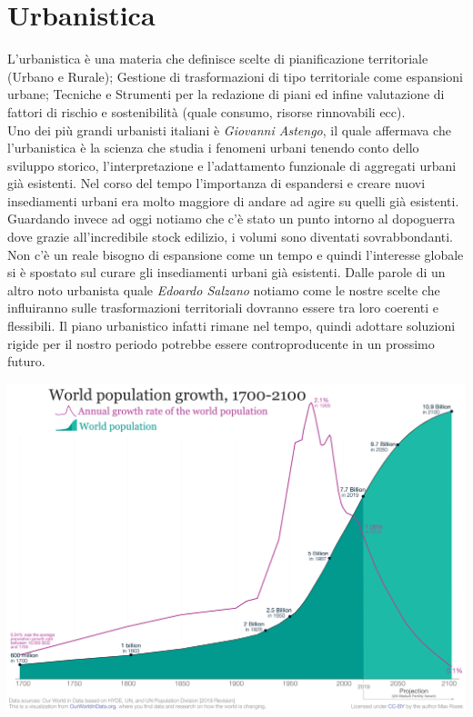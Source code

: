 \documentclass[a4paper,12pt, oneside]{book}
\begin{document}
\section{Urbanistica}
L'urbanistica è una materia che definisce scelte di pianificazione territoriale (Urbano e Rurale); Gestione di trasformazioni di tipo territoriale come espansioni urbane; Tecniche e Strumenti per la redazione di piani ed infine valutazione di fattori di rischio e sostenibilità (quale consumo, risorse rinnovabili ecc).\\
Uno dei più grandi urbanisti italiani è \textit{Giovanni Astengo}, il quale affermava che l'urbanistica è la scienza che studia i fenomeni urbani tenendo conto dello sviluppo storico, l'interpretazione e l'adattamento funzionale di aggregati urbani già esistenti.\newline
Nel corso del tempo l'importanza di espandersi e creare nuovi insediamenti urbani era molto maggiore di andare ad agire su quelli già esistenti. Guardando invece ad oggi notiamo che c'è stato un punto intorno al dopoguerra dove grazie all'incredibile stock edilizio, i volumi sono diventati sovrabbondanti. Non c'è un reale bisogno di espansione come un tempo e quindi l'interesse globale si è spostato sul curare gli insediamenti urbani già esistenti.\newline
Dalle parole di un altro noto urbanista quale \textit{Edoardo Salzano} notiamo come le nostre scelte che influiranno sulle trasformazioni territoriali dovranno essere tra loro coerenti e flessibili. Il piano urbanistico infatti rimane nel  tempo, quindi adottare soluzioni rigide per il nostro periodo potrebbe essere controproducente in un prossimo futuro.
\leavevmode\\
 \begin{center}
   \includegraphics[width=0.7\linewidth]{"Immagini/2019-World-Population-Growth-1700-2100"}
 \end{center}
\end{document}

